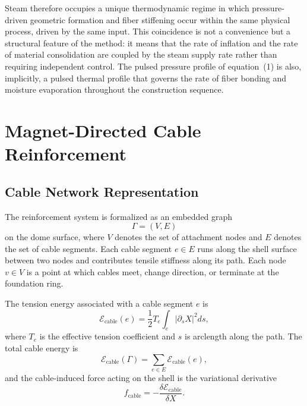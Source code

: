 \documentclass[12pt,a4paper]{article}
\begin{document}
Steam therefore occupies a unique thermodynamic regime in which
pressure-driven geometric formation and fiber stiffening occur within
the same physical process, driven by the same input. This coincidence
is not a convenience but a structural feature of the method: it means
that the rate of inflation and the rate of material consolidation are
coupled by the steam supply rate rather than requiring independent
control. The pulsed pressure profile of equation~(1) is also, implicitly,
a pulsed thermal profile that governs the rate of fiber bonding and
moisture evaporation throughout the construction sequence.

\section{Magnet-Directed Cable Reinforcement}

\subsection{Cable Network Representation}

The reinforcement system is formalized as an embedded graph
\begin{equation}
\Gamma = (V,E)
\end{equation}
on the dome surface, where $V$ denotes the set of attachment nodes and
$E$ denotes the set of cable segments. Each cable segment $e \in E$
runs along the shell surface between two nodes and contributes tensile
stiffness along its path. Each node $v \in V$ is a point at which
cables meet, change direction, or terminate at the foundation ring.

The tension energy associated with a cable segment $e$ is
\begin{equation}
\mathcal{E}_{\mathrm{cable}}(e)
= \frac{1}{2} T_e \int_e \left|\partial_s X\right|^2 ds,
\end{equation}
where $T_e$ is the effective tension coefficient and $s$ is arclength
along the path. The total cable energy is
\begin{equation}
\mathcal{E}_{\mathrm{cable}}(\Gamma)
= \sum_{e \in E} \mathcal{E}_{\mathrm{cable}}(e),
\end{equation}
and the cable-induced force acting on the shell is the variational
derivative
\begin{equation}
f_{\mathrm{cable}} = -\frac{\delta \mathcal{E}_{\mathrm{cable}}}{\delta X}.
\end{equation}
\end{document}
